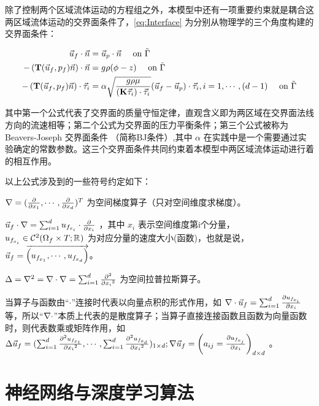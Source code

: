 除了控制两个区域流体运动的方程组之外，本模型中还有一项重要约束就是耦合这两区域流体运动的交界面条件了，\eqref{eq:Interface} 为分别从物理学的三个角度构建的交界面条件：

\begin{equation}\label{eq:Interface}
    \begin{aligned}
        \Uf \cdot \vec{n} &= \Up \cdot \vec{n} \quad \text{ on } \iB \\
        -\left(\opTf \vec{n} \right) \cdot \vec{n} &= g \rho (\pp - z) \quad \text{ on } \iB \\
        -\left(\opTf \vec{n} \right) \cdot \vec{\tau}_i &= \alpha \sqrt{\frac{g \rho \mu}{(\matfmt{K} \vec{\tau}_i) \cdot \vec{\tau}_i}} (\Uf - \Up) \cdot \vec{\tau}_i, i=1, \cdots ,(d-1) \quad \text{ on } \iB \\
    \end{aligned}
\end{equation}

其中第一个公式代表了交界面的质量守恒定律，直观含义即为两区域在交界面法线方向的流速相等；第二个公式为交界面的压力平衡条件；第三个公式被称为 Beavers-Joseph 交界面条件 \cite{beavers1967boundary}（简称BJ条件）,其中 $\alpha$ 在实践中是一个需要通过实验确定的常数参数。这三个交界面条件共同约束着本模型中两区域流体运动进行着的相互作用。

以上公式涉及到的一些符号约定如下：

$\gradOp = (\toD{}{x_1},\cdots,\toD{}{x_d})^T$ 为空间梯度算子（只对空间维度求梯度）。

$\Uf \cdot \gradOp = \sum_{i=1}^{d} \Ufi \cdot \toD{}{x_i} $ ，其中 $x_i$ 表示空间维度第i个分量， $\Ufi \in \C[2](\Df; \R)$ 为对应分量的速度大小(函数)，也就是说，$\Uf = \overrightarrow{\left(\Ufi[1],\cdots,\Ufi[d]\right)}$。

$ \laplaceOp = \gradOp^2 = \gradOp \cdot \gradOp = \sum_{i=1}^{d} \toDsqua{}{x_i}$ 为空间拉普拉斯算子。

当算子与函数由“$\cdot$”连接时代表以向量点积的形式作用，如 $\gradOp \cdot \Uf = \sum_{i=1}^{d} \toD{\Ufi}{x_i}$等，所以“$\gradOp \cdot$”本质上代表的是散度算子；当算子直接连接函数且函数为向量函数时，则代表数乘或矩阵作用，如 $ \laplaceOp \Uf = (\sum_{i=1}^{d} \toDsqua{\Ufi[1]}{x_i},\cdots,\sum_{i=1}^{d} \toDsqua{\Ufi[d]}{x_i})_{1 \times d}; \gradOp \Uf = \left(a_{i j} = \toD{\Ufi[j]}{x_i} \right )_{d \times d}$ 。

\section{神经网络与深度学习算法}

